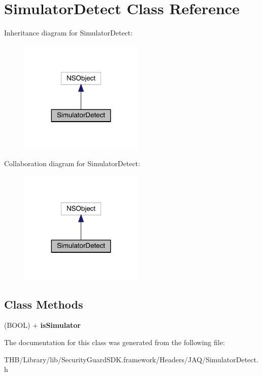 \hypertarget{interface_simulator_detect}{}\section{Simulator\+Detect Class Reference}
\label{interface_simulator_detect}


Inheritance diagram for Simulator\+Detect\+:\nopagebreak
\begin{figure}[H]
\begin{center}
\leavevmode
\includegraphics[width=167pt]{interface_simulator_detect__inherit__graph}
\end{center}
\end{figure}


Collaboration diagram for Simulator\+Detect\+:\nopagebreak
\begin{figure}[H]
\begin{center}
\leavevmode
\includegraphics[width=167pt]{interface_simulator_detect__coll__graph}
\end{center}
\end{figure}
\subsection*{Class Methods}
\begin{DoxyCompactItemize}
\item 
\mbox{\label{interface_simulator_detect_a2958cf9d5bf8ba31cbdd88f6db6d603a}} 
(B\+O\+OL) + {\bfseries is\+Simulator}
\end{DoxyCompactItemize}


The documentation for this class was generated from the following file\+:\begin{DoxyCompactItemize}
\item 
T\+H\+B/\+Library/lib/\+Security\+Guard\+S\+D\+K.\+framework/\+Headers/\+J\+A\+Q/Simulator\+Detect.\+h\end{DoxyCompactItemize}
